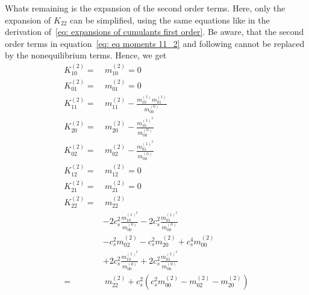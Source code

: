 Whats remaining is the expansion of the second order terms.
Here, only the expansion of $K_{22}$ can be simplified, using the same equations like in the derivation of~\eqref{eq: expansions of cumulants first order}.
Be aware, that the second order terms in equation~\eqref{eq: eq moments 11_2} and following cannot be replaced by the nonequilibrium terms.
Hence, we get
\begin{equation}
  \label{eq: expansions of cumulants second order}
  \begin{aligned}
    K_{10}^{(2)} =&\ m_{10}^{(2)} = 0\\
    K_{01}^{(2)} =&\ m_{01}^{(2)} = 0\\
    K_{11}^{(2)} =&\ m_{11}^{(2)} - \frac{ m_{10}^{(1)}m_{01}^{(1)}}{m_{00}^{(0)}} \\
    K_{20}^{(2)} =&\ m_{20}^{(2)} - \frac{ m_{10}^{{(1)}^2}}{m_{00}^{(0)}} \\
    K_{02}^{(2)} =&\ m_{02}^{(2)} - \frac{ m_{01}^{{(1)}^2}}{m_{00}^{(0)}} \\
    K_{12}^{(2)} =&\ m_{12}^{(2)} = 0\\
    K_{21}^{(2)} =&\ m_{21}^{(2)} = 0\\
    K_{22}^{(2)}
    = &\
    m_{22}^{(2)}
    \\&
    - 2 c_s^2 \frac{ m_{10}^{{(1)}^2} }{m_{00}^{(0)}}
    - 2 c_s^2 \frac{ m_{01}^{{(1)}^2} }{m_{00}^{(0)}}
    \\&
    - c_s^2 m_{02}^{(2)}
    - c_s^2 m_{20}^{(2)}
    + c_s^4 m_{00}^{(2)}
    \\&
    + 2 c_s^2\frac{ m_{10}^{{(1)}^2} }{m_{00}^{(0)}}
    + 2 c_s^2\frac{ m_{01}^{{(1)}^2} }{m_{00}^{(0)}}
    \\= &\
    m_{22}^{(2)}
    + c_s^2\left(c_s^2 m_{00}^{(2)}
    - m_{02}^{(2)}
    - m_{20}^{(2)}
    \right)
  \end{aligned}
\end{equation}
